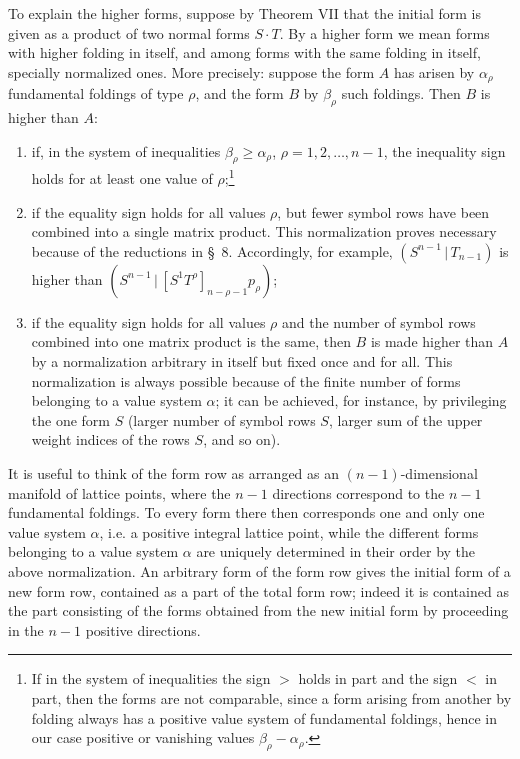 \documentclass[11pt]{article}
\newcommand{\pair}[2]{(#1\,|\,#2)}
\begin{document}
To explain the higher forms, suppose by Theorem VII that the initial form is given as a product of two normal forms $S\cdot T$. By a higher form we mean forms with higher folding in itself, and among forms with the same folding in itself, specially normalized ones. More precisely: suppose the form $A$ has arisen by $\alpha_\rho$ fundamental foldings of type $\rho$, and the form $B$ by $\beta_\rho$ such foldings. Then $B$ is higher than $A$:
\begin{enumerate}
\item if, in the system of inequalities $\beta_\rho\ge\alpha_\rho$, $\rho=1,2,\ldots,n-1$, the inequality sign holds for at least one value of $\rho$;\footnote{If in the system of inequalities the sign $>$ holds in part and the sign $<$ in part, then the forms are not comparable, since a form arising from another by folding always has a positive value system of fundamental foldings, hence in our case positive or vanishing values $\beta_\rho-\alpha_\rho$.}
\item if the equality sign holds for all values $\rho$, but fewer symbol rows have been combined into a single matrix product. This normalization proves necessary because of the reductions in \S\ 8. Accordingly, for example, $\pair{S^{n-1}}{T_{n-1}}$ is higher than $\pair{S^{n-1}}{[S^1T^\rho]_{n-\rho-1}p_\rho}$;
\item if the equality sign holds for all values $\rho$ and the number of symbol rows combined into one matrix product is the same, then $B$ is made higher than $A$ by a normalization arbitrary in itself but fixed once and for all. This normalization is always possible because of the finite number of forms belonging to a value system $\alpha$; it can be achieved, for instance, by privileging the one form $S$ (larger number of symbol rows $S$, larger sum of the upper weight indices of the rows $S$, and so on).
\end{enumerate}
It is useful to think of the form row as arranged as an $(n-1)$-dimensional manifold of lattice points, where the $n-1$ directions correspond to the $n-1$ fundamental foldings. To every form there then corresponds one and only one value system $\alpha$, i.e. a positive integral lattice point, while the different forms belonging to a value system $\alpha$ are uniquely determined in their order by the above normalization. An arbitrary form of the form row gives the initial form of a new form row, contained as a part of the total form row; indeed it is contained as the part consisting of the forms obtained from the new initial form by proceeding in the $n-1$ positive directions.
\end{document}
